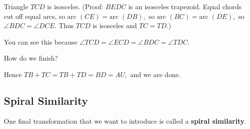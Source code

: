 






Triangle $TCD$ is isosceles. (Proof: $BEDC$ is an isosceles trapezoid.  Equal chords cut off equal arcs, so $\text{arc }(CE) =\text{arc }(DB),$ so $\text{arc } (BC) = \text{arc }(DE),$ so $\angle BDC = \angle DCE.$  Thus $TCD$ is isosceles and $TC = TD.$)

You can see this because $\angle TCD = \angle ECD = \angle BDC = \angle TDC.$

How do we finish?






Hence $TB + TC = TB + TD = BD = AU,$ and we are done.

\subsection{Spiral Similarity}
One final transformation that we want to introduce is called a \textbf{spiral similarity}.

